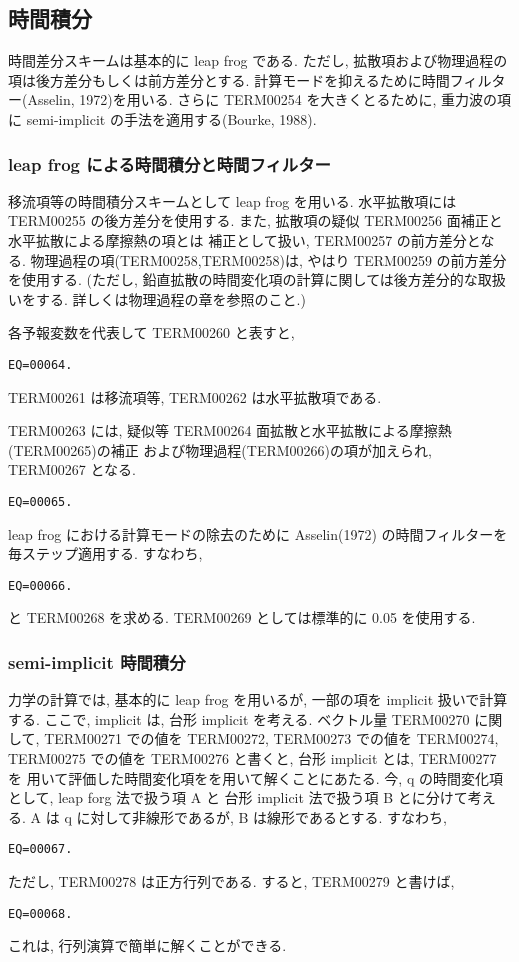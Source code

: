 ﻿\subsection{時間積分}

時間差分スキームは基本的に leap frog である.
ただし, 拡散項および物理過程の項は後方差分もしくは前方差分とする.
計算モードを抑えるために時間フィルター(Asselin, 1972)を用いる.
さらに TERM00254 を大きくとるために,
重力波の項に semi-implicit の手法を適用する(Bourke, 1988).

\subsubsection{leap frog による時間積分と時間フィルター}

移流項等の時間積分スキームとして leap frog を用いる.
水平拡散項には TERM00255 の後方差分を使用する.
また, 拡散項の疑似 TERM00256 面補正と水平拡散による摩擦熱の項とは
補正として扱い, TERM00257 の前方差分となる.
物理過程の項(TERM00258,TERM00258)は,
やはり TERM00259 の前方差分を使用する.
(ただし, 鉛直拡散の時間変化項の計算に関しては後方差分的な取扱いをする.
詳しくは物理過程の章を参照のこと.)

各予報変数を代表して TERM00260 と表すと,
%
\begin{verbatim}
EQ=00064.
\end{verbatim}
%
TERM00261 は移流項等,
TERM00262 は水平拡散項である.

TERM00263 には, 
疑似等 TERM00264 面拡散と水平拡散による摩擦熱(TERM00265)の補正
および物理過程(TERM00266)の項が加えられ,
TERM00267 となる.
%
\begin{verbatim}
EQ=00065.
\end{verbatim}

leap frog における計算モードの除去のために 
Asselin(1972) の時間フィルターを毎ステップ適用する.
すなわち, 
%
\begin{verbatim}
EQ=00066.
\end{verbatim}
%
と TERM00268 を求める.
TERM00269 としては標準的に 0.05 を使用する. 

\subsubsection{semi-implicit 時間積分}

力学の計算では, 基本的に leap frog を用いるが,
一部の項を implicit 扱いで計算する.
ここで, implicit は, 台形 implicit を考える.
ベクトル量 TERM00270 に関して,
TERM00271 での値を TERM00272,
TERM00273 での値を TERM00274,
TERM00275 での値を TERM00276 と書くと,
台形 implicit とは,
TERM00277 を
用いて評価した時間変化項をを用いて解くことにあたる.
%
今, {\boldmath q} の時間変化項として,
leap forg 法で扱う項 A と 台形 implicit 法で扱う項 B とに分けて考える.
A は {\boldmath q} に対して非線形であるが, B は線形であるとする.
すなわち,
%
\begin{verbatim}
EQ=00067.
\end{verbatim}
%
ただし, TERM00278 は正方行列である. すると,
TERM00279
と書けば,
\begin{verbatim}
EQ=00068.
\end{verbatim}
%
これは, 行列演算で簡単に解くことができる.

